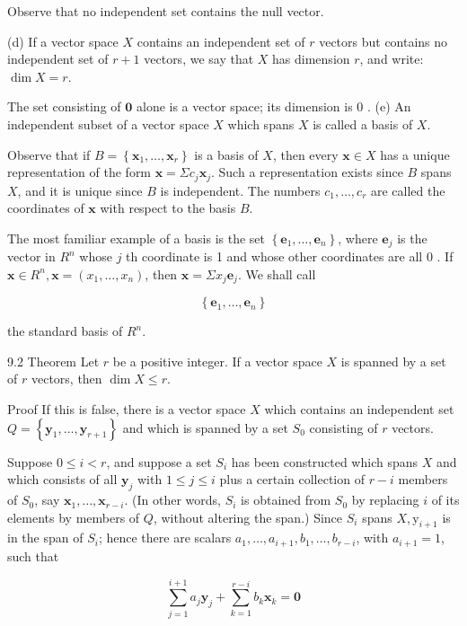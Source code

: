 \documentclass[10pt]{article}
\begin{document}
Observe that no independent set contains the null vector.

(d) If a vector space $X$ contains an independent set of $r$ vectors but contains no independent set of $r+1$ vectors, we say that $X$ has dimension $r$, and write: $\operatorname{dim} X=r$.

The set consisting of $\mathbf{0}$ alone is a vector space; its dimension is 0 . (e) An independent subset of a vector space $X$ which spans $X$ is called a basis of $X$.

Observe that if $B=\left\{\mathbf{x}_{1}, \ldots, \mathbf{x}_{r}\right\}$ is a basis of $X$, then every $\mathbf{x} \in X$ has a unique representation of the form $\mathbf{x}=\Sigma c_{j} \mathbf{x}_{j}$. Such a representation exists since $B$ spans $X$, and it is unique since $B$ is independent. The numbers $c_{1}, \ldots, c_{r}$ are called the coordinates of $\mathbf{x}$ with respect to the basis $B$.

The most familiar example of a basis is the set $\left\{\mathbf{e}_{1}, \ldots, \mathbf{e}_{n}\right\}$, where $\mathbf{e}_{j}$ is the vector in $R^{n}$ whose $j$ th coordinate is 1 and whose other coordinates are all 0 . If $\mathbf{x} \in R^{n}, \mathbf{x}=\left(x_{1}, \ldots, x_{n}\right)$, then $\mathbf{x}=\Sigma x_{j} \mathbf{e}_{j}$. We shall call

$$
\left\{\mathbf{e}_{1}, \ldots, \mathbf{e}_{n}\right\}
$$

the standard basis of $R^{n}$.

9.2 Theorem Let $r$ be a positive integer. If a vector space $X$ is spanned by a set of $r$ vectors, then $\operatorname{dim} X \leq r$.

Proof If this is false, there is a vector space $X$ which contains an independent set $Q=\left\{\mathbf{y}_{1}, \ldots, \mathbf{y}_{r+1}\right\}$ and which is spanned by a set $S_{0}$ consisting of $r$ vectors.

Suppose $0 \leq i<r$, and suppose a set $S_{i}$ has been constructed which spans $X$ and which consists of all $\mathbf{y}_{j}$ with $1 \leq j \leq i$ plus a certain collection of $r-i$ members of $S_{0}$, say $\mathbf{x}_{1}, \ldots, \mathbf{x}_{r-i}$. (In other words, $S_{i}$ is obtained from $S_{0}$ by replacing $i$ of its elements by members of $Q$, without altering the span.) Since $S_{i}$ spans $X, \mathrm{y}_{i+1}$ is in the span of $S_{i}$; hence there are scalars $a_{1}, \ldots, a_{i+1}, b_{1}, \ldots, b_{r-i}$, with $a_{i+1}=1$, such that

$$
\sum_{j=1}^{i+1} a_{j} \mathbf{y}_{j}+\sum_{k=1}^{r-i} b_{k} \mathbf{x}_{k}=\mathbf{0}
$$
\end{document}
